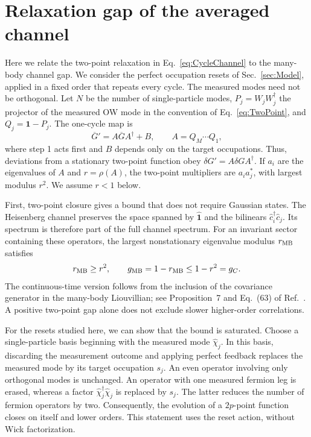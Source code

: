 \documentclass[aps,prb,10pt,twocolumn,superscriptaddress,longbibliography,floatfix]{revtex4-2}
\newcommand{\claudeadd}[1]{{\color{orange}#1}}
\begin{document}
{\color{blue}
\section{Relaxation gap of the averaged channel}
\label{app:ChannelGap}

Here we relate the two-point relaxation in Eq.~\eqref{eq:CycleChannel} to the many-body channel gap. We consider the perfect occupation resets of Sec.~\ref{sec:Model}, applied in a fixed order that repeats every cycle. The measured modes need not be orthogonal. Let $N$ be the number of single-particle modes, \claudeadd{$P_j=W_jW_j^\dagger$} the projector of the measured OW mode in the convention of Eq.~\eqref{eq:TwoPoint}, and $Q_j=\mathbf{1}-P_j$. The one-cycle map is
\begin{equation}
    \overline G'=A\overline GA^\dagger+B,
    \qquad A=Q_M\cdots Q_1,
    \label{eq:AppCycleChannel}
\end{equation}
where step 1 acts first and $B$ depends only on the target occupations. Thus, deviations from a stationary two-point function obey $\delta G'=A\delta GA^\dagger$. If $a_i$ are the eigenvalues of $A$ and $r=\rho(A)$, the two-point multipliers are $a_i a_j^*$, with largest modulus $r^2$. We assume $r<1$ below.

First, two-point closure gives a bound that does not require Gaussian states. The Heisenberg channel preserves the space spanned by $\hat{\mathbf{1}}$ and the bilinears $\hat c_i^\dagger\hat c_j$. Its spectrum is therefore part of the full channel spectrum. For an invariant sector containing these operators, the largest nonstationary eigenvalue modulus $r_{\rm MB}$ satisfies
\begin{equation}
    r_{\rm MB}\geq r^2,
    \qquad g_{\rm MB}=1-r_{\rm MB}\leq 1-r^2=g_C.
    \label{eq:ChannelGapBound}
\end{equation}
The continuous-time version follows from the inclusion of the covariance generator in the many-body Liouvillian; see Proposition~7 and Eq.~(63) of Ref.~\cite{BarthelZhang2022}. A positive two-point gap alone does not exclude slower higher-order correlations.

For the resets studied here, we can show that the bound is saturated. Choose a single-particle basis beginning with the measured mode $\hat\chi_j$. In this basis, discarding the measurement outcome and applying perfect feedback replaces the measured mode by its target occupation $s_j$. An even operator involving only orthogonal modes is unchanged. An operator with one measured fermion leg is erased, whereas a factor $\hat\chi_j^\dagger\hat\chi_j$ is replaced by $s_j$. The latter reduces the number of fermion operators by two. Consequently, the evolution of a $2p$-point function closes on itself and lower orders. This statement uses the reset action, without Wick factorization.

}
\end{document}
